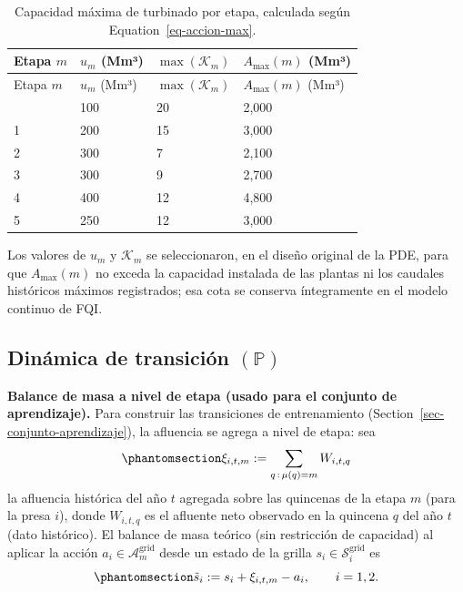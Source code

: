 \documentclass[
  letterpaper,
  DIV=11,
  numbers=noendperiod]{scrreprt}
\theoremstyle{definition}
\theoremstyle{remark}
\begin{document}
\begin{longtable}[]{@{}llll@{}}
\caption{Capacidad máxima de turbinado por etapa, calculada según
Equation~\ref{eq-accion-max}.}\label{tbl-accion-max}\tabularnewline
\toprule\noalign{}
Etapa \(m\) & \(u_m\) (Mm³) & \(\max(\mathcal K_m)\) & \(A_{\max}(m)\)
(Mm³) \\
\midrule\noalign{}
\endfirsthead
\toprule\noalign{}
Etapa \(m\) & \(u_m\) (Mm³) & \(\max(\mathcal K_m)\) & \(A_{\max}(m)\)
(Mm³) \\
\midrule\noalign{}
\endhead
\bottomrule\noalign{}
\endlastfoot
0 & 100 & 20 & 2,000 \\
1 & 200 & 15 & 3,000 \\
2 & 300 & 7 & 2,100 \\
3 & 300 & 9 & 2,700 \\
4 & 400 & 12 & 4,800 \\
5 & 250 & 12 & 3,000 \\
\end{longtable}

Los valores de \(u_m\) y \(\mathcal K_{m}\) se seleccionaron, en el
diseño original de la PDE, para que \(A_{\max}(m)\) no exceda la
capacidad instalada de las plantas ni los caudales históricos máximos
registrados; esa cota se conserva íntegramente en el modelo continuo de
FQI.

\subsection{\texorpdfstring{Dinámica de transición
\((\mathbb{P})\)}{Dinámica de transición (\textbackslash mathbb\{P\})}}\label{dinuxe1mica-de-transiciuxf3n-mathbbp-1}

\textbf{Balance de masa a nivel de etapa (usado para el conjunto de
aprendizaje).} Para construir las transiciones de entrenamiento
(Section~\ref{sec-conjunto-aprendizaje}), la afluencia se agrega a nivel
de etapa: sea
\begin{equation}\protect\phantomsection\label{eq-afluencia-etapa}{
\xi_{i,t,m} := \sum_{q\,:\,\mu(q)=m} W_{i,t,q}
}\end{equation} la afluencia histórica del año \(t\) agregada sobre las
quincenas de la etapa \(m\) (para la presa \(i\)), donde \(W_{i,t,q}\)
es el afluente neto observado en la quincena \(q\) del año \(t\) (dato
histórico). El balance de masa teórico (sin restricción de capacidad) al
aplicar la acción \(a_i\in\mathcal A_m^{\text{grid}}\) desde un estado
de la grilla \(s_i\in\mathcal S_i^{\text{grid}}\) es
\begin{equation}\protect\phantomsection\label{eq-transicion}{
\tilde s_i := s_i + \xi_{i,t,m} - a_i, \qquad i=1,2.
}\end{equation}
\end{document}
